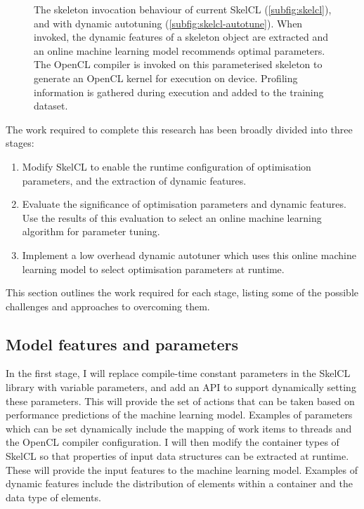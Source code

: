 \begin{figure*}[t!]
\centering

\caption{The skeleton invocation behaviour of current SkelCL
  (\ref{subfig:skelcl}), and with dynamic autotuning
  (\ref{subfig:skelcl-autotune}). When invoked, the dynamic features
  of a skeleton object are extracted and an online machine learning
  model recommends optimal parameters. The OpenCL compiler is invoked
  on this parameterised skeleton to generate an OpenCL kernel for
  execution on device. Profiling information is gathered during
  execution and added to the training dataset.}
\label{fig:method}
\end{figure*}

The work required to complete this research has been broadly divided
into three stages:

\begin{enumerate}
\item Modify SkelCL to enable the runtime configuration of
  optimisation parameters, and the extraction of dynamic features.
\item Evaluate the significance of optimisation parameters and dynamic
  features. Use the results of this evaluation to select an online
  machine learning algorithm for parameter tuning.
\item Implement a low overhead dynamic autotuner which uses this
  online machine learning model to select optimisation parameters at
  runtime.
\end{enumerate}

This section outlines the work required for each stage, listing some
of the possible challenges and approaches to overcoming them.

\subsection{Model features and parameters}
In the first stage, I will replace compile-time constant parameters in
the SkelCL library with variable parameters, and add an API to support
dynamically setting these parameters. This will provide the set of
actions that can be taken based on performance predictions of the
machine learning model. Examples of parameters which can be set
dynamically include the mapping of work items to threads and the
OpenCL compiler configuration. I will then modify the container types
of SkelCL so that properties of input data structures can be extracted
at runtime. These will provide the input features to the machine
learning model. Examples of dynamic features include the distribution
of elements within a container and the data type of elements.

